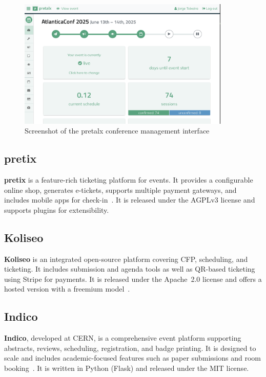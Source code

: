 \begin{figure}[h!]
  \centering
  \includegraphics[width=0.9\textwidth]{imaxes/pretalx.com-ui.png}
  \caption{Screenshot of the pretalx conference management interface}
  \label{fig:pretalx-ui}
\end{figure}

\subsection*{pretix}
\textbf{pretix} is a feature-rich ticketing platform for events. It provides a configurable online shop, generates e-tickets, supports multiple payment gateways, and includes mobile apps for check-in~\cite{pretix-docs}. It is released under the AGPLv3 license and supports plugins for extensibility.

\subsection*{Koliseo}
\textbf{Koliseo} is an integrated open-source platform covering CFP, scheduling, and ticketing. It includes submission and agenda tools as well as QR-based ticketing using Stripe for payments. It is released under the Apache~2.0 license and offers a hosted version with a freemium model~\cite{koliseo-website}.

\subsection*{Indico}
\textbf{Indico}, developed at CERN, is a comprehensive event platform supporting abstracts, reviews, scheduling, registration, and badge printing. It is designed to scale and includes academic-focused features such as paper submissions and room booking~\cite{indico-github}. It is written in Python (Flask) and released under the MIT license.

